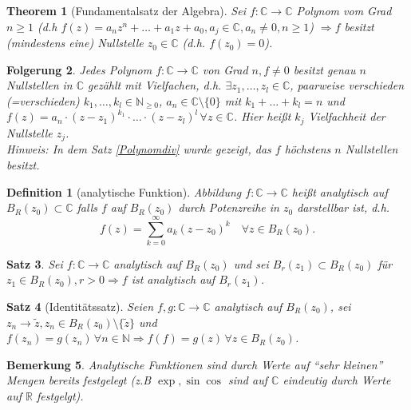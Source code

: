 \documentclass[ngerman,a4paper]{report}
\theoremstyle{break}
\newtheorem{theorem}{Theorem}[section]
\newtheorem{satz}[theorem]{Satz}
\newtheorem*{definition}{Definition}
\newtheorem{remark}[theorem]{Bemerkung}
\newtheorem{conclusion}[theorem]{Folgerung}
\begin{document}
\begin{theorem}[Fundamentalsatz der Algebra]\label{Fundam_algebra}
    Sei $f: \mathbb{C} \to \mathbb{C}$ Polynom vom Grad $n\geq 1$ (d.h $f(z) = a_n z^n + \dots + a_1 z + a_0,a_j \in \mathbb{C}, a_n \neq 0, n\geq 1$) $\Rightarrow f$ besitzt (mindestens eine) Nullstelle $z_0 \in \mathbb{C}$ (d.h. $f(z_0) = 0$).
\end{theorem}

\begin{conclusion}
    Jedes Polynom $f: \mathbb{C} \to \mathbb{C}$ von Grad $n, f\neq 0$ besitzt genau $n$ Nullstellen in $\mathbb{C}$ gezählt mit Vielfachen, d.h. $\exists z_1,\dots,z_l \in \mathbb{C}$, paarweise verschieden (=verschieden) $k_1,\dots, k_l \in \mathbb{N}_{\geq 0}$, $a_n \in \mathbb{C}\setminus\{0\}$ mit $k_1 + \dots + k_l = n$ und $f(z) = a_n \cdot (z-z_1)^{k_1}\cdot\dots\cdot(z-z_l)^{l}\,\forall z \in \mathbb{C}$. Hier heißt $k_j$ Vielfachheit der Nullstelle $z_j$.\\
    Hinweis: In dem Satz \ref{Polynomdiv} wurde gezeigt, das $f$ höchstens $n$ Nullstellen besitzt.
\end{conclusion}

\begin{definition}[analytische Funktion]
    Abbildung $f:\mathbb{C} \to \mathbb{C}$ heißt analytisch auf $B_R(z_0)\subset \mathbb{C}$ falls $f$ auf $B_R(z_0)$ durch Potenzreihe in $z_0$ darstellbar ist, d.h.
    \[
    f(z)=\sum_{k=0}^{\infty} a_k(z-z_0)^k \quad \forall z \in B_R(z_0).
    \]
\end{definition}

\begin{satz}
    Sei $f:\mathbb{C}\to\mathbb{C}$ analytisch auf $B_R(z_0)$ und sei $B_r(z_1) \subset B_R(z_0)$ für $z_1 \in B_R(z_0),r>0 \Rightarrow f$ ist analytisch auf $B_r(z_1)$.
\end{satz}

\begin{satz}[Identitätssatz]
    Seien $f,g:\mathbb{C} \to \mathbb{C}$ analytisch auf $B_R(z_0)$, sei $z_n \to \tilde{z},z_n\in B_R(z_0)\setminus\{\tilde{z}\}$ und $f(z_n) = g(z_n)\,\forall n \in \mathbb{N} \Rightarrow f(f) = g(z)\,\forall z \in B_R(z_0)$.
\end{satz}

\begin{remark}
    Analytische Funktionen sind durch Werte auf "`sehr kleinen"' Mengen bereits festgelegt (z.B $\exp,\sin\cos$ sind auf $\mathbb{C}$ eindeutig durch Werte auf $\mathbb{R}$ festgelgt).
\end{remark}
\end{document}
